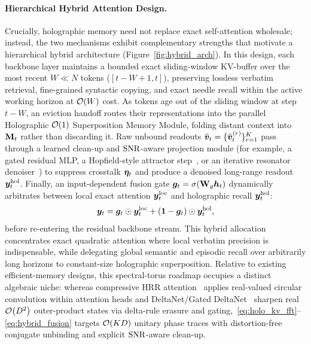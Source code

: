 \paragraph{Hierarchical Hybrid Attention Design.}
Crucially, holographic memory need not replace exact self-attention wholesale; instead, the two mechanisms exhibit complementary strengths that motivate a hierarchical hybrid architecture (Figure~\ref{fig:hybrid_arch}).
In this design, each backbone layer maintains a bounded exact sliding-window KV-buffer over the most recent $W \ll N$ tokens ($[t-W+1, t]$), preserving lossless verbatim retrieval, fine-grained syntactic copying, and exact needle recall within the active working horizon at $\mathcal{O}\!\left(W\right)$ cost.
As tokens age out of the sliding window at step $t - W$, an eviction handoff routes their representations into the parallel Holographic $\mathcal{O}\!\left(1\right)$ Superposition Memory Module, folding distant context into $\mathbf{M}_t$ rather than discarding it.
Raw unbound readouts $\tilde{\boldsymbol{v}}_t = \{\tilde{\boldsymbol{v}}_t^{(r)}\}_{r=1}^{K}$ pass through a learned clean-up and $\mathrm{SNR}$-aware projection module (for example, a gated residual MLP, a Hopfield-style attractor step~\cite{RAMSAUER_MODERN_HOPFIELD}, or an iterative resonator denoiser~\cite{FRADY_2020_RESONATOR}) to suppress crosstalk $\boldsymbol{\eta}_t$ and produce a denoised long-range readout $\boldsymbol{y}_t^{\mathrm{hol}}$.
Finally, an input-dependent fusion gate $\boldsymbol{g}_t = \sigma(\mathbf{W}_g \boldsymbol{h}_t)$ dynamically arbitrates between local exact attention $\boldsymbol{y}_t^{\mathrm{loc}}$ and holographic recall $\boldsymbol{y}_t^{\mathrm{hol}}$:
\begin{equation}\label{eq:hybrid_fusion}
    \boldsymbol{y}_t = \boldsymbol{g}_t \odot \boldsymbol{y}_t^{\mathrm{loc}} + (\boldsymbol{1} - \boldsymbol{g}_t) \odot \boldsymbol{y}_t^{\mathrm{hol}},
\end{equation}
before re-entering the residual backbone stream.
This hybrid allocation concentrates exact quadratic attention where local verbatim precision is indispensable, while delegating global semantic and episodic recall over arbitrarily long horizons to constant-size holographic superposition.
Relative to existing efficient-memory designs, this spectral-torus roadmap occupies a distinct algebraic niche: whereas compressive HRR attention~\cite{HOLOGRAPHIC_ATTENTION_OR_KV_CACHE} applies real-valued circular convolution within attention heads and DeltaNet/Gated DeltaNet~\cite{YANG_2024_DELTANET,YANG_2025_GATED_DELTANET} sharpen real $\mathcal{O}\!\left(D^2\right)$ outer-product states via delta-rule erasure and gating,~\eqref{eq:holo_kv_fft}--\eqref{eq:hybrid_fusion} targets $\mathcal{O}\!\left(KD\right)$ unitary phase traces with distortion-free conjugate unbinding and explicit $\mathrm{SNR}$-aware clean-up.
